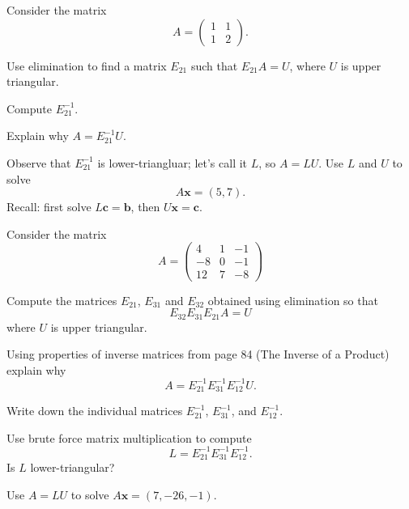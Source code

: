 \documentclass[minion]{homework}
\begin{document}
\begin{aproblems}
\aproblem
Consider the matrix
\[
A=\begin{pmatrix} 1 & 1 \\ 1 & 2 \end{pmatrix}.
\]
\begin{subproblems}
\item Use elimination to find a matrix $E_{21}$ such that $E_{21} A = U$,
where $U$ is upper triangular.

\item Compute $E_{21}^{-1}$.

\item Explain why $A = E_{21}^{-1} U$.

\item Observe that $E_{21}^{-1}$ is lower-triangluar; let's call it $L$,
so $A=LU$.  Use $L$ and $U$ to solve
\[
A\mathbf x = (5,7).
\]
Recall: first solve $L\mathbf c =\mathbf b$, then $U\mathbf x = \mathbf c$.
\end{subproblems}

\aproblem  
Consider the matrix 
\[
A=\begin{pmatrix} 
4  &1 &-1\\ 
-8 & 0 & -1 \\
12 & 7 &-8
\end{pmatrix}
\]
\begin{subproblems}

\item
Compute the matrices $E_{21}$, $E_{31}$ and $E_{32}$ obtained using elimination
so that
\[
E_{32}E_{31}E_{21} A = U
\]
where $U$ is upper triangular.

\item Using properties of inverse matrices from page 84 (The Inverse of a Product) explain why
\[
A = E_{21}^{-1} E_{31}^{-1}E_{12}^{-1} U.
\]

\item Write down the individual matrices 
$E_{21}^{-1}$,  $E_{31}^{-1}$, and $E_{12}^{-1}$.

\item Use brute force matrix multiplication to compute
\[
L = E_{21}^{-1} E_{31}^{-1}E_{12}^{-1}.
\]
Is $L$ lower-triangular?

\item Use $A=LU$ to solve $A\mathbf{x}=(7,-26,-1)$.
\end{subproblems}

\end{aproblems}
\end{document}
